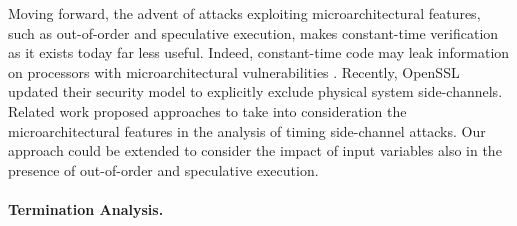 Moving forward, the advent of attacks exploiting microarchitectural features, such as out-of-order and speculative execution, makes constant-time verification as it exists today far less useful.
Indeed, constant-time code may leak information on processors with microarchitectural vulnerabilities .
Recently, OpenSSL updated their security model to explicitly exclude physical system side-channels.
Related work  proposed approaches to take into consideration the microarchitectural features in the analysis of timing side-channel attacks.
Our approach could be extended to consider the impact of input variables also in the presence of out-of-order and speculative execution.

\paragraph{Termination Analysis.}



